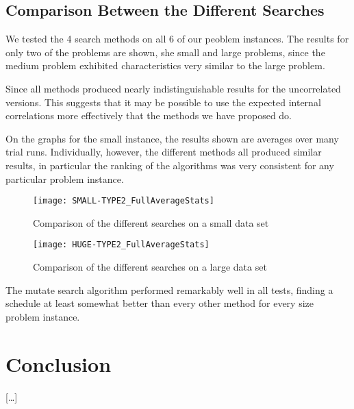 \documentclass[letterpaper]{article}
\begin{document}
      
  \subsection{Comparison Between the Different Searches}
    We tested the 4 search methods on all 6 of our peoblem instances. The results for 
    only two of the problems are shown, she small and large problems, since the medium 
    problem exhibited characteristics very similar to the large problem.
    
    Since all methods produced nearly indistinguishable results for the uncorrelated 
    versions. This suggests that it may be possible to use the expected internal 
    correlations more effectively that the methods we have proposed do.
    
    On the graphs for the small instance, the results shown are averages over many trial 
    runs. Individually, however, the different methods all produced similar results, in 
    particular the ranking of the algorithms was very consistent for any particular problem 
    instance.
    
    \begin{figure}[H]
  	  \centering
  	  \texttt{[image: SMALL-TYPE2\_FullAverageStats]}
      \caption{Comparison of the different searches on a small data set}
	\end{figure}
	
	\begin{figure}[H]
  	  \centering
  	  \texttt{[image: HUGE-TYPE2\_FullAverageStats]}
      \caption{Comparison of the different searches on a large data set}
	\end{figure}
	
	The mutate search algorithm performed remarkably well in all tests, finding a 
	schedule at least somewhat better than every other method for every size problem 
	instance.
  
\section{Conclusion}
  [\ldots]
  
\nocite{*}


\end{document}
